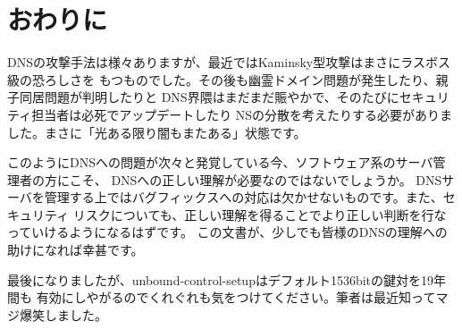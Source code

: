 \section{おわりに}
DNSの攻撃手法は様々ありますが、最近ではKaminsky型攻撃はまさにラスボス級の恐ろしさを
もつものでした。その後も幽霊ドメイン問題が発生したり、親子同居問題が判明したりと
DNS界隈はまだまだ賑やかで、そのたびにセキュリティ担当者は必死でアップデートしたり
NSの分散を考えたりする必要がありました。まさに「光ある限り闇もまたある」状態です。

このようにDNSへの問題が次々と発覚している今、ソフトウェア系のサーバ管理者の方にこそ、
DNSへの正しい理解が必要なのではないでしょうか。
DNSサーバを管理する上ではバグフィックスへの対応は欠かせないものです。また、セキュリティ
リスクについても、正しい理解を得ることでより正しい判断を行なっていけるようになるはずです。
この文書が、少しでも皆様のDNSの理解への助けになれば幸甚です。

最後になりましたが、unbound-control-setupはデフォルト1536bitの鍵対を19年間も
有効にしやがるのでくれぐれも気をつけてください。筆者は最近知ってマジ爆笑しました。

